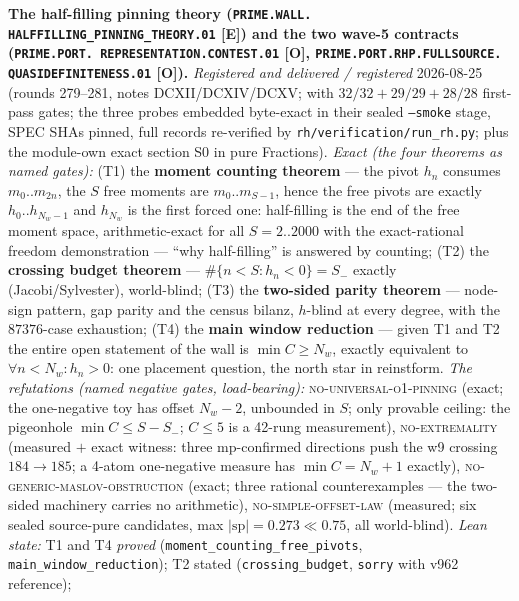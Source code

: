 \documentclass[11pt,a4paper]{article}
\begin{document}
\par\smallskip\noindent\textbf{The half-filling pinning theory
(\texttt{PRIME.WALL.\allowbreak
HALFFILLING\_PINNING\_THEORY.01} [E]) and the two wave-5
contracts (\texttt{PRIME.PORT.\allowbreak
REPRESENTATION.\allowbreak CONTEST.01} [O],
\texttt{PRIME.PORT.RHP.\allowbreak FULLSOURCE.\allowbreak
QUASIDEFINITENESS.01} [O]).}
{\sloppy
\emph{Registered and delivered / registered} 2026-08-25 (rounds
279--281, notes DCXII/DCXIV/DCXV;
 with $32/32 + 29/29
+ 28/28$ first-pass gates; the three probes embedded byte-exact
in their sealed \texttt{--smoke} stage, SPEC SHAs pinned, full
records re-verified by \texttt{rh/verification/run\_rh.py}; plus
the module-own exact section S0 in pure Fractions).  \emph{Exact
(the four theorems as named gates):} (T1) the \textbf{moment
counting theorem} --- the pivot $h_n$ consumes $m_0..m_{2n}$, the
$S$ free moments are $m_0..m_{S-1}$, hence the free pivots are
exactly $h_0..h_{N_w-1}$ and $h_{N_w}$ is the first forced one:
half-filling is the end of the free moment space, arithmetic-exact
for all $S = 2..2000$ with the exact-rational freedom
demonstration --- ``why half-filling'' is answered by counting;
(T2) the \textbf{crossing budget theorem} --- $\#\{n < S : h_n <
0\} = S_-$ exactly (Jacobi/Sylvester), world-blind; (T3) the
\textbf{two-sided parity theorem} --- node-sign pattern, gap
parity and the census bilanz, $h$-blind at every degree, with the
$87376$-case exhaustion; (T4) the \textbf{main window reduction}
--- given T1 and T2 the entire open statement of the wall is
$\min C \ge N_w$, exactly equivalent to $\forall n < N_w : h_n >
0$: one placement question, the north star in reinstform.
\emph{The refutations (named negative gates, load-bearing):}
\textsc{no-universal-o1-pinning} (exact; the one-negative toy has
offset $N_w - 2$, unbounded in $S$; only provable ceiling: the
pigeonhole $\min C \le S - S_-$; $C \le 5$ is a 42-rung
measurement), \textsc{no-extremality} (measured $+$ exact
witness: three mp-confirmed directions push the w9 crossing $184
\to 185$; a 4-atom one-negative measure has $\min C = N_w + 1$
exactly), \textsc{no-generic-maslov-obstruction} (exact; three
rational counterexamples --- the two-sided machinery carries no
arithmetic), \textsc{no-simple-offset-law} (measured; six sealed
source-pure candidates, max $|\mathrm{sp}| = 0.273 \ll 0.75$, all
world-blind).  \emph{Lean state:} T1 and T4 \emph{proved}
(\texttt{moment\_counting\_free\_pivots},
\texttt{main\_window\_reduction}); T2 stated
(\texttt{crossing\_budget}, \texttt{sorry} with v962 reference);
}
\end{document}

